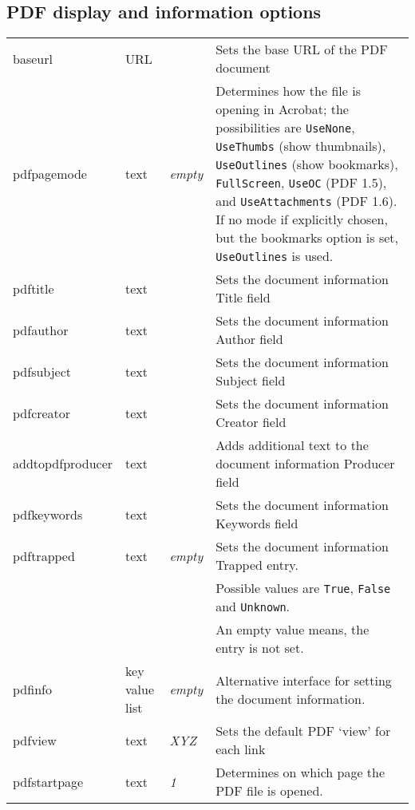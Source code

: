 \documentclass[pdftex]{article}
\begin{document}
\subsection{PDF display and information options}
\begin{longtable}{@{}>{\ttfamily}l>{\raggedright}p{}>{\itshape}lp{7cm}@{}}
baseurl            & URL     &       & Sets the base URL of the PDF document \\
pdfpagemode        & text    & empty & Determines how the file is opening in Acrobat; the possibilities are
                                       \texttt{UseNone}, \texttt{UseThumbs} (show thumbnails), \texttt{UseOutlines}
                                       (show bookmarks), \texttt{FullScreen}, \texttt{UseOC} (PDF 1.5),
                                       and \texttt{UseAttachments} (PDF 1.6). If no mode if explicitly chosen, but the
                                       bookmarks option is set, \texttt{UseOutlines} is used. \\
pdftitle           & text    &       & Sets the document information Title field \\
pdfauthor          & text    &       & Sets the document information Author field \\
pdfsubject         & text    &       & Sets the document information Subject field \\
pdfcreator         & text    &       & Sets the document information Creator field \\
addtopdfproducer   & text    &       & Adds additional text to the document information Producer field \\
pdfkeywords        & text    &       & Sets the document information Keywords field \\
pdftrapped         & text    & empty & Sets the document information Trapped entry.\\
&&& Possible values are \texttt{True}, \texttt{False} and \texttt{Unknown}.\\
&&& An empty value means, the entry is not set.\\
pdfinfo            & key value list & empty & Alternative interface for setting the
                                              document information.\\
pdfview            & text    & XYZ   & Sets the default PDF `view' for each link \\
pdfstartpage       & text    & 1     & Determines on which page the PDF file is opened. \\

\end{longtable}
\end{document}
